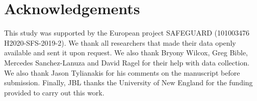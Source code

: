 \documentclass[
  12pt,
  a4paper,
]{article}
\begin{document}
\hypertarget{acknowledgements}{%
\section{Acknowledgements}\label{acknowledgements}}

This study was supported by the European project SAFEGUARD (101003476 H2020-SFS-2019-2). We thank all researchers that made their data openly available and sent it upon request. We also thank Bryony Wilcox, Greg Bible, Mercedes Sanchez-Lanuza and David Ragel for their help with data collection. We also thank Jason Tylianakis for his comments on the manuscript before submission. Finally, JBL thanks the University of New England for the funding provided to carry out this work.

\singlespacing

\begin{table}


\end{table}
\end{document}
